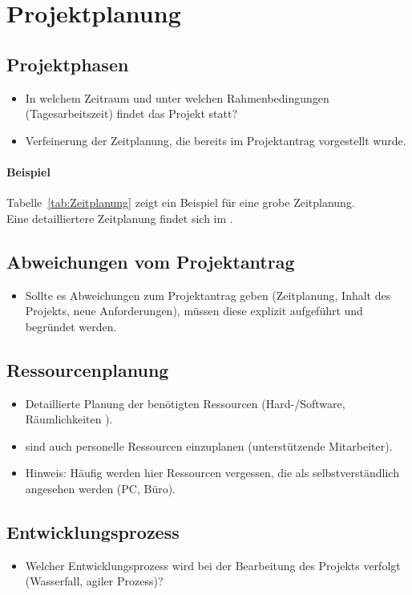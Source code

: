 \section{Projektplanung} 
\label{sec:Projektplanung}


\subsection{Projektphasen}
\label{sec:Projektphasen}

\begin{itemize}
	\item In welchem Zeitraum und unter welchen Rahmenbedingungen (\zB Tagesarbeitszeit) findet das Projekt statt?
	\item Verfeinerung der Zeitplanung, die bereits im Projektantrag vorgestellt wurde.
\end{itemize}

\paragraph{Beispiel}
Tabelle~\ref{tab:Zeitplanung} zeigt ein Beispiel für eine grobe Zeitplanung.
\\
Eine detailliertere Zeitplanung findet sich im .


\subsection{Abweichungen vom Projektantrag}
\label{sec:AbweichungenProjektantrag}

\begin{itemize}
	\item Sollte es Abweichungen zum Projektantrag geben (\zB Zeitplanung, Inhalt des Projekts, neue Anforderungen), müssen diese explizit aufgeführt und begründet werden.
\end{itemize}


\subsection{Ressourcenplanung}
\label{sec:Ressourcenplanung}

\begin{itemize}
	\item Detaillierte Planung der benötigten Ressourcen (Hard-/Software, Räumlichkeiten \usw).
	\item \Ggfs sind auch personelle Ressourcen einzuplanen (\zB unterstützende Mitarbeiter).
	\item Hinweis: Häufig werden hier Ressourcen vergessen, die als selbstverständlich angesehen werden (\zB PC, Büro). 
\end{itemize}


\subsection{Entwicklungsprozess}
\label{sec:Entwicklungsprozess}
\begin{itemize}
	\item Welcher Entwicklungsprozess wird bei der Bearbeitung des Projekts verfolgt (\zB Wasserfall, agiler Prozess)?
\end{itemize}